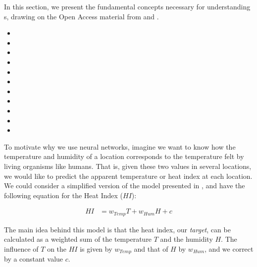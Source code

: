 \label{02_neural_networks}

In this section, we present the fundamental concepts necessary for understanding \neuralNetwork{}s, drawing on the Open Access material from  and .

\begin{itemize}
    \item {}
    \item {}
    \item {}
    \item {}
    \item {}
    \item {}
    \item {}

    \item {}
    \item {}
    \item {}
    \item {}
\end{itemize}

\label{02_nn_motivating_example}

To motivate why we use neural networks, imagine we want to know how the temperature and humidity of a location corresponds to the temperature felt by living organisms like humans. That is, given these two values in several locations, we would like to predict the apparent temperature or heat index at each location. We could consider a simplified version of the model presented in  \cite{heat_index}, and have the following equation for the Heat Index ($HI$):

\begin{align*}
    HI &= w_{Temp} T + w_{Hum} H + c
\end{align*}


The main idea behind this model is that the heat index, our \emph{target}, can be calculated as a weighted sum of the temperature $T$ and the humidity $H$. The influence of $T$ on the $HI$ is given by $w_{Temp}$ and that of $H$ by $w_{Hum}$, and we correct by a constant value $c$. 


